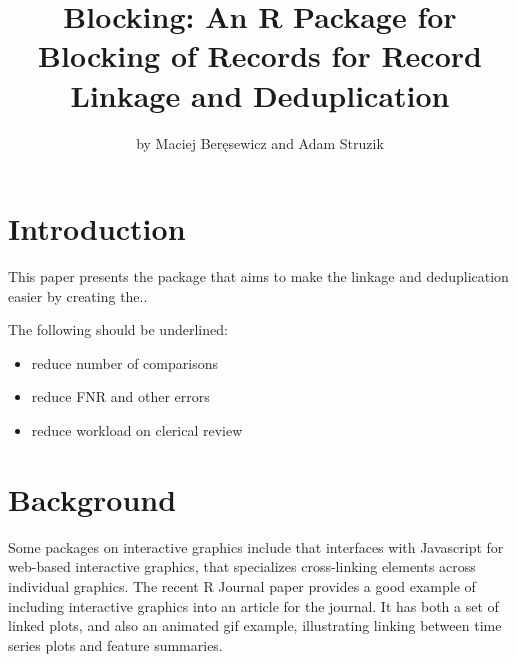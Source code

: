 \title{Blocking: An R Package for Blocking of Records for Record Linkage and Deduplication}


\author{by Maciej Beręsewicz and Adam Struzik}

\maketitle


\section{Introduction}\label{introduction}

This paper presents the  package that aims to make the linkage and deduplication easier by creating the..

The following should be underlined:

\begin{itemize}
\tightlist
\item
  reduce number of comparisons
\item
  reduce FNR and other errors
\item
  reduce workload on clerical review
\end{itemize}

\section{Background}\label{background}

Some packages on interactive graphics include  \citep{plotly} that interfaces with Javascript for web-based interactive graphics,  \citep{crosstalk} that specializes cross-linking elements across individual graphics. The recent R Journal paper  \citep{RJ-2021-050} provides a good example of including interactive graphics into an article for the journal. It has both a set of linked plots, and also an animated gif example, illustrating linking between time series plots and feature summaries.

